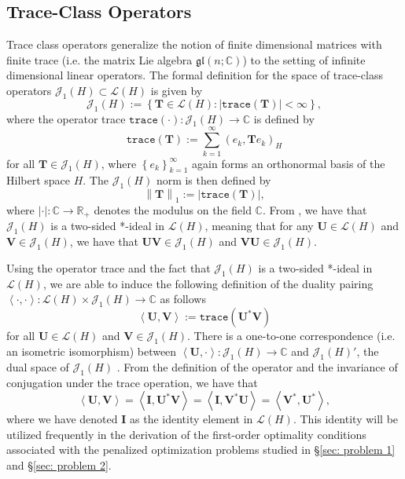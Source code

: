 \documentclass{amsart}
\newcommand{\sL}{\mathscr L}
\newcommand{\sJ}{\mathscr J}
\newcommand{\p}[1]{\left( {#1} \right)}
\newcommand{\norm}[1]{\left\| #1 \right\|}
\newcommand{\Br}[1]{\left\{ #1 \right\}}
\newcommand{\dual}[1]{\left< #1 \right>}
\newcommand{\trace}[1]{\texttt{trace}\left( #1\right)}
\newcommand{\bI}{\mathbf I}
\newcommand{\bT}{\mathbf T}
\begin{document}
\subsection{Trace-Class Operators}
Trace class operators generalize the notion of finite dimensional matrices with finite trace (i.e. the matrix Lie algebra $\mathfrak{gl} (n;\mathbb C)$) to the setting of infinite dimensional linear operators. The formal definition for the space of trace-class operators $\sJ_1(H)\subset \sL(H)$ is given by
$$
    \sJ_1(H) := \Br{\bT \in \sL(H) : |\trace{\bT}| < \infty},
$$
where the operator trace $\trace{\cdot}: \sJ_1(H) \rightarrow \mathbb C$ is defined by 
$$
    \trace{\bT} := \sum_{k=1}^\infty \p{e_k, \bT e_k}_{H}
$$
for all $\bT \in \sJ_1(H)$, where $\Br{e_k}_{k=1}^\infty$ again forms an orthonormal basis of the Hilbert space $H$. The $\sJ_1(H)$ norm is then defined by
$$
    \norm{\bT}_1 := |\trace{\bT}|,
$$
where $|\cdot|:\mathbb C \rightarrow \mathbb R_+$ denotes the modulus on the field $\mathbb C$. From \cite[Theorem 18.11]{conway2025course}, we have that $\sJ_1(H)$ is a two-sided *-ideal in $\sL(H)$, meaning that for any $\mathbf U \in \sL(H)$ and $\mathbf V \in \sJ_1(H)$, we have that $\mathbf U \mathbf V \in \sJ_1(H)$ and $\mathbf V\mathbf U \in \sJ_1(H)$. 

Using the operator trace and the fact that $\sJ_1(H)$ is a two-sided *-ideal in $\sL(H)$, we are able to induce the following definition of the duality pairing $\dual{\cdot,\cdot}: \sL(H)\times\sJ_1(H) \rightarrow \mathbb C$ as follows
$$ 
    \dual{\mathbf U, \mathbf V} 
    := \trace{\mathbf U^* \mathbf V}
$$
for all $\mathbf U \in \sL(H)$ and $\mathbf V \in \sJ_1(H)$. There is a one-to-one correspondence (i.e. an isometric isomorphism) between $\dual{\mathbf U, \cdot}: \sJ_1(H) \rightarrow \mathbb C$ and $\sJ_1(H)'$, the dual space of $\sJ_1(H)$ \cite[Theorem 19.2]{conway2025course}. From the definition of the operator and the invariance of conjugation under the trace operation, we have that
\begin{equation}
\label{eqn: operator adjoint trace identity}
    \dual{\mathbf U, \mathbf V} 
    = \dual{\bI, \mathbf U^* \mathbf V} 
    = \dual{\bI, \mathbf V^* \mathbf U} 
    = \dual{\mathbf V^*, \mathbf U^*},
\end{equation}
where we have denoted $\bI$ as the identity element in $\sL\p{H}$. This identity will be utilized frequently in the derivation of the first-order optimality conditions associated with the penalized optimization problems studied in \S \ref{sec: problem 1} and \S\ref{sec: problem 2}. 
\end{document}
